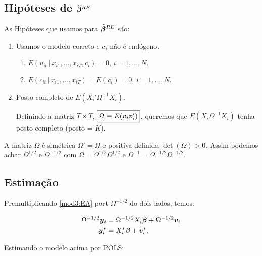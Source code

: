 \documentclass[11pt,oneside,a4paper]{article}
\numberwithin{equation}{section}
\begin{document}
\subsection*{Hipóteses de $\boldsymbol{\widehat{\beta}}^{RE}$}

As Hipóteses que usamos para $\boldsymbol{\widehat{\beta}}^{RE}$ são:

\begin{enumerate} \itemsep0pt
\item  
Usamos o modelo correto e $c_{i}$ não é endógeno.

\begin{enumerate}[label =\alph*)]
\item 
	$E( u_{it} \, | \,  x_{i1}, \dots, x_{iT}, c_{i} ) = 0$,
	$i = 1, \dots, N$.
\item        
	$E( c_{it} \, | \, x_{i1}, \dots, x_{iT} ) = E( c_{i} ) = 0$,
	$i = 1, \dots, N$.
\end{enumerate}

\item  Posto completo de $E( X_{i}' \Omega^{-1} X_{i} )$.

Definindo a matriz $T \times T$, $\boxed{\Omega \equiv E(\boldsymbol{v}_{i} \boldsymbol{v}_{i}')}$, queremos que $E( X_{i} \Omega^{-1} X_{i} )$ tenha posto completo (posto = $K$).
\end{enumerate}

A matriz $\Omega$ é simétrica $\Omega' = \Omega$ e positiva definida $\det(\Omega) > 0$.
Assim podemos achar $\Omega^{1/2}$ e $\Omega^{-1/2}$ com $\Omega = \Omega^{1/2} \Omega^{1/2}$ e $\Omega^{-1} = \Omega^{-1/2} \Omega^{-1/2}$.

\subsection*{Estimação}

Premultiplicando \eqref{mod3:EA} port $\Omega^{-1/2}$ do dois lados, temos:

\vspace{-1 em}
\begin{align} 
\notag
\Omega^{-1/2}\boldsymbol{y}_{i} &= \Omega^{-1/2}X_{i} \boldsymbol{\beta} + \Omega^{-1/2}\boldsymbol{v}_{i}
\\
\label{mod4:EA}
\boldsymbol{y}_{i}^{*} &= X_{i}^{*} \boldsymbol{\beta} + \boldsymbol{v}_{i}^{*},
\end{align}

Estimando o modelo acima por POLS:
\end{document}
